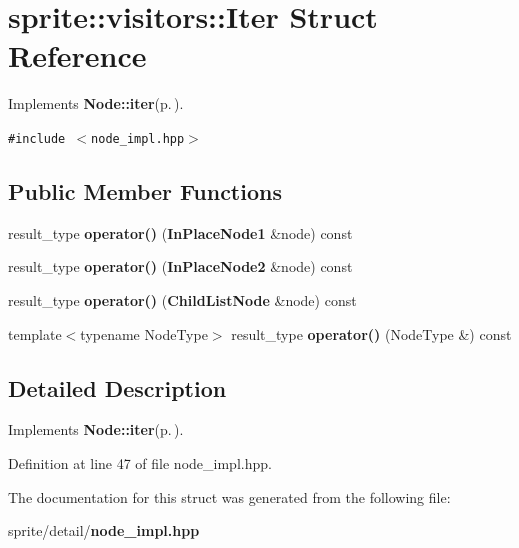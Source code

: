 \section{sprite::visitors::Iter Struct Reference}
\label{structsprite_1_1visitors_1_1Iter}
Implements {\bf Node::iter}{\rm (p.\,\pageref{structsprite_1_1Node_a7})}.  


{\tt \#include $<$node\_\-impl.hpp$>$}

\subsection*{Public Member Functions}
\begin{CompactItemize}
\item 
result\_\-type {\bf operator()} ({\bf In\-Place\-Node1} \&node) const \label{structsprite_1_1visitors_1_1Iter_a0}

\item 
result\_\-type {\bf operator()} ({\bf In\-Place\-Node2} \&node) const \label{structsprite_1_1visitors_1_1Iter_a1}

\item 
result\_\-type {\bf operator()} ({\bf Child\-List\-Node} \&node) const \label{structsprite_1_1visitors_1_1Iter_a2}

\item 
template$<$typename Node\-Type$>$ result\_\-type {\bf operator()} (Node\-Type \&) const \label{structsprite_1_1visitors_1_1Iter_a3}

\end{CompactItemize}


\subsection{Detailed Description}
Implements {\bf Node::iter}{\rm (p.\,\pageref{structsprite_1_1Node_a7})}. 



Definition at line 47 of file node\_\-impl.hpp.

The documentation for this struct was generated from the following file:\begin{CompactItemize}
\item 
sprite/detail/{\bf node\_\-impl.hpp}\end{CompactItemize}
